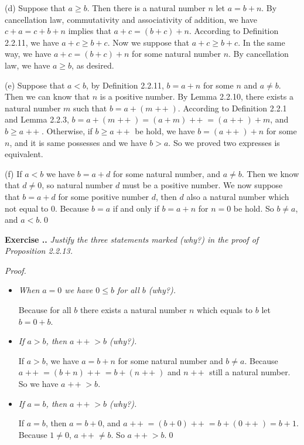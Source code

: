 \documentclass{book}
\DeclareMathOperator{\tadd}{+\!+}%
\newcommand{\pff}{\vspace{.25em}\noindent\emph{Proof.}~~}
\newcounter{Exercise}[section]
\renewcommand{\theExercise}{\thesection.\arabic{Exercise}.}
\newcommand{\new}{\vspace{1.5em}\noindent\textbf{{Exercise \stepcounter{Exercise}\textbf{\theExercise}}} }
\begin{document}
(d) Suppose that $a \geq b$. Then there is a natural number $n$ let $a = b + n$. By cancellation law, commutativity and associativity of addition, we have $c + a = c + b + n$ implies that $a + c = (b + c) + n$. According to Definition 2.2.11, we have $a + c \geq b + c$. Now we suppose that $a + c \geq b + c$. In the same way, we have $a + c = (b + c) + n$ for some natural number $n$. By cancellation law, we have $a \geq b$, as desired. 

(e) Suppose that $a < b$, by Definition 2.2.11, $b = a + n$ for some $n$ and $a \neq b$. Then we can know that $n$ is a positive number. By Lemma 2.2.10, there exists a natural number $m$ such that $b = a + (m\tadd)$. According to Definition 2.2.1 and Lemma 2.2.3, $b = a + (m\tadd) = (a + m)\tadd = (a\tadd) + m$, and $ b \geq a\tadd$. Otherwise, if $b \geq a\tadd$ be hold, we have $b = (a\tadd) + n$ for some $n$, and it is same possesses and we have $b > a$. So we proved two expresses is equivalent.

(f) If $a < b$ we have $b = a + d$ for some natural number, and $a \neq b$. Then we know that $d \neq 0$, so natural number $d$ must be a positive number. We now suppose that $b = a + d$ for some positive number $d$, then $d$ also a natural number which not equal to $0$. Because $b = a$ if and only if $b = a + n$ for $n = 0$ be hold. So $b \neq a$, and $a < b$.\qed 


\new\emph{Justify the three statements marked (why?) in the proof of Proposition 2.2.13.}

\pff
\begin{itemize}
    \item \emph{When $a=0$ we have $0\leq b$ for all $b$ (why?).}

    Because for all $b$ there exists a natural number $ n $ which equals to $ b $ let $ b=0 + b$.

    \item \emph{If $a>b$, then $a\tadd>b$ (why?).}

    If $a>b$, we have $a=b+n$ for some natural number and $b\neq a$. Because $a\tadd=(b+n)\tadd=b+(n\tadd)$ and $n\tadd$ still a natural number. So we have $a\tadd>b$.

    \item \emph{If $a=b$, then $a\tadd>b$ (why?).}

    If $a=b$, then $a=b+0$, and $a\tadd=(b+0)\tadd=b+(0\tadd)=b+1$. Because $1\ne0$, $a\tadd\neq b$. So $a\tadd>b$.\qed
\end{itemize}
\end{document}
